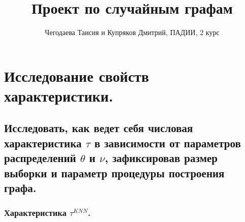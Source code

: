 \documentclass{report}
\title{Проект по случайным графам}
\author{Чегодаева Таисия и Купряков Дмитрий, ПАДИИ, 2 курс}
\begin{document}
\maketitle

\part{Исследование свойств характеристики.}
\chapter{Исследовать, как ведет себя числовая характеристика $\tau$ в зависимости от параметров распределений $\theta$ и $\nu$, зафиксировав размер выборки и параметр процедуры построения графа.}
\section{Характеристика $\tau^{KNN}$.}
\end{document}
